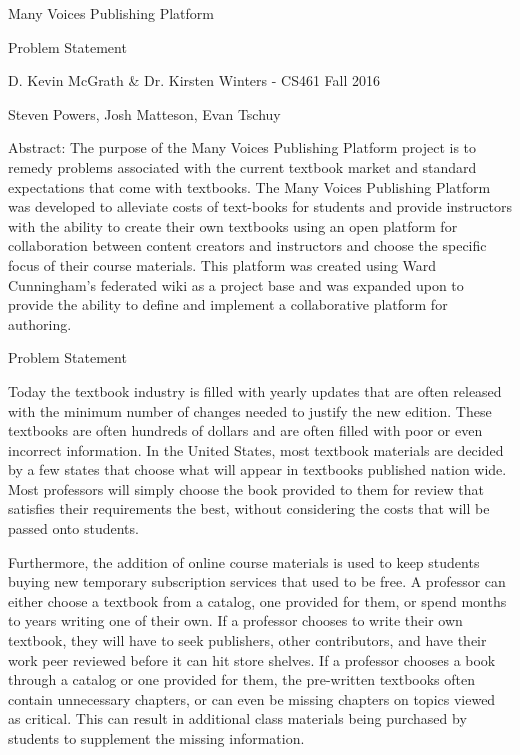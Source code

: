 \documentclass[letterpaper, 10pt, draftclsnofoot, onecolumn]{IEEEtran}
\begin{document}
\begin{titlepage}
\centering
{\huge Many Voices Publishing Platform\par}
{\LARGE Problem Statement\par}
{\vspace{2mm}}
{\large D. Kevin McGrath \& Dr. Kirsten Winters -  CS461 Fall 2016\par}
{\large Steven Powers, Josh Matteson, Evan Tschuy\par}
{\vspace{10mm}}
{\large Abstract:  The purpose of the Many Voices Publishing Platform project is to remedy problems 
associated with the current textbook market and standard expectations that come 
with textbooks. The Many Voices Publishing Platform was developed to alleviate 
costs of text-books for students and provide instructors with the ability 
to create their own textbooks using an open platform for collaboration between 
content creators and instructors and choose the specific focus of their course materials. 
This platform was created using Ward Cunningham’s federated wiki as a project 
base and was expanded upon to provide the ability to define and implement a 
collaborative platform for authoring.\par}
\end{titlepage}

\vspace{1pc}
\centerline{\sc \large Problem Statement}
\vspace{2pc}

 Today the textbook industry is filled with yearly updates that are often released with the
minimum number of changes needed to justify the new edition. These textbooks are often hundreds of dollars 
and are often filled with poor or even incorrect information. In the United States, most textbook materials are 
decided by a few states that choose what will appear in textbooks published nation wide. Most professors will
simply choose the book provided to them for review that satisfies their requirements the best, without 
considering the costs that will be passed onto students.
 
Furthermore, the addition of online course materials is used to keep students buying new 
temporary subscription services that used to be free. A professor can either choose a textbook 
from a catalog, one provided for them, or spend months to years writing one of their own. 
If a professor chooses to write their own textbook, they will have to seek publishers,
other contributors, and have their work peer reviewed before it can hit store shelves. 
If a professor chooses a book through a catalog or one provided for them, the pre-written textbooks 
often contain unnecessary chapters, or can even be missing chapters on topics viewed as critical. This can result in 
additional class materials being purchased by students to supplement the missing information. \\
\end{document}
